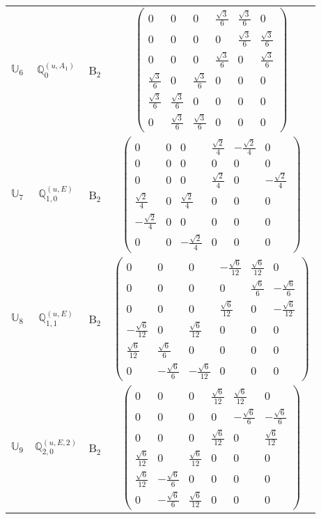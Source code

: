 \documentclass[fleqn,10pt,landscape]{article}
\begin{document}
\begin{itemize}
\begin{center}
\begin{longtable}{c|c|c|c}
$ \mathbb{U}_{6} $ & $\mathbb{Q}_{0}^{(u,A_{1})}$ & B$_{2}$ & $\begin{pmatrix} 0 & 0 & 0 & \frac{\sqrt{3}}{6} & \frac{\sqrt{3}}{6} & 0 \\ 0 & 0 & 0 & 0 & \frac{\sqrt{3}}{6} & \frac{\sqrt{3}}{6} \\ 0 & 0 & 0 & \frac{\sqrt{3}}{6} & 0 & \frac{\sqrt{3}}{6} \\ \frac{\sqrt{3}}{6} & 0 & \frac{\sqrt{3}}{6} & 0 & 0 & 0 \\ \frac{\sqrt{3}}{6} & \frac{\sqrt{3}}{6} & 0 & 0 & 0 & 0 \\ 0 & \frac{\sqrt{3}}{6} & \frac{\sqrt{3}}{6} & 0 & 0 & 0 \end{pmatrix}$ \\
$ \mathbb{U}_{7} $ & $\mathbb{Q}_{1,0}^{(u,E)}$ & B$_{2}$ & $\begin{pmatrix} 0 & 0 & 0 & \frac{\sqrt{2}}{4} & - \frac{\sqrt{2}}{4} & 0 \\ 0 & 0 & 0 & 0 & 0 & 0 \\ 0 & 0 & 0 & \frac{\sqrt{2}}{4} & 0 & - \frac{\sqrt{2}}{4} \\ \frac{\sqrt{2}}{4} & 0 & \frac{\sqrt{2}}{4} & 0 & 0 & 0 \\ - \frac{\sqrt{2}}{4} & 0 & 0 & 0 & 0 & 0 \\ 0 & 0 & - \frac{\sqrt{2}}{4} & 0 & 0 & 0 \end{pmatrix}$ \\
$ \mathbb{U}_{8} $ & $\mathbb{Q}_{1,1}^{(u,E)}$ & B$_{2}$ & $\begin{pmatrix} 0 & 0 & 0 & - \frac{\sqrt{6}}{12} & \frac{\sqrt{6}}{12} & 0 \\ 0 & 0 & 0 & 0 & \frac{\sqrt{6}}{6} & - \frac{\sqrt{6}}{6} \\ 0 & 0 & 0 & \frac{\sqrt{6}}{12} & 0 & - \frac{\sqrt{6}}{12} \\ - \frac{\sqrt{6}}{12} & 0 & \frac{\sqrt{6}}{12} & 0 & 0 & 0 \\ \frac{\sqrt{6}}{12} & \frac{\sqrt{6}}{6} & 0 & 0 & 0 & 0 \\ 0 & - \frac{\sqrt{6}}{6} & - \frac{\sqrt{6}}{12} & 0 & 0 & 0 \end{pmatrix}$ \\
$ \mathbb{U}_{9} $ & $\mathbb{Q}_{2,0}^{(u,E,2)}$ & B$_{2}$ & $\begin{pmatrix} 0 & 0 & 0 & \frac{\sqrt{6}}{12} & \frac{\sqrt{6}}{12} & 0 \\ 0 & 0 & 0 & 0 & - \frac{\sqrt{6}}{6} & - \frac{\sqrt{6}}{6} \\ 0 & 0 & 0 & \frac{\sqrt{6}}{12} & 0 & \frac{\sqrt{6}}{12} \\ \frac{\sqrt{6}}{12} & 0 & \frac{\sqrt{6}}{12} & 0 & 0 & 0 \\ \frac{\sqrt{6}}{12} & - \frac{\sqrt{6}}{6} & 0 & 0 & 0 & 0 \\ 0 & - \frac{\sqrt{6}}{6} & \frac{\sqrt{6}}{12} & 0 & 0 & 0 \end{pmatrix}$ \\

\end{longtable}
\end{center}
\end{itemize}
\end{document}
